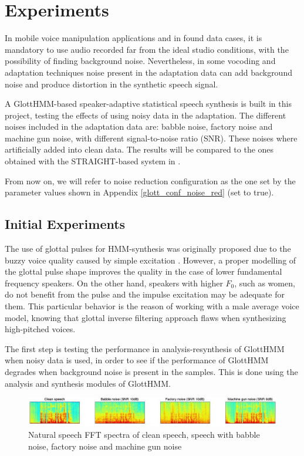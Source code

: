 \section{Experiments}
\label{experiments}
In mobile voice manipulation applications and in found data cases, it is mandatory to use audio recorded far from the ideal studio conditions, with the possibility of finding background noise.
%
Nevertheless, in some vocoding and adaptation techniques noise present in the adaptation data can add background noise and produce distortion in the synthetic speech signal.

A GlottHMM-based speaker-adaptive statistical speech synthesis is built in this project, testing the effects of using noisy data in the adaptation.
%
The different noises included in the adaptation data are: babble noise, factory noise and machine gun noise, with different signal-to-noise ratio (SNR).
%
These noises where artificially added into clean data.
%
The results will be compared to the ones obtained with the STRAIGHT-based system in \cite{karhila_jstsp_14}.

From now on, we will refer to noise reduction configuration as the one set by the parameter values shown in Appendix \ref{glott_conf_noise_red} (set to true).

\subsection{Initial Experiments}
\label{experiments_initial}
The use of glottal pulses for HMM-synthesis was originally proposed due to the buzzy voice quality caused by simple excitation \cite{raitio2008hmm}.
%
However, a proper modelling of the glottal pulse shape improves the quality in the case of lower fundamental frequency speakers. On the other hand, speakers with higher $F_{0}$, such as women, do not benefit from the pulse and the impulse excitation may be adequate for them.
%
This particular behavior is the reason of working with a male average voice model, knowing that glottal inverse filtering approach flaws when synthesizing high-pitched voices.

The first step is testing the performance in analysis-resynthesis of GlottHMM when noisy data is used, in order to see if the performance of GlottHMM degrades when background noise is present in the samples. This is done using the analysis and synthesis modules of GlottHMM.

\begin{figure}[!htb]
\begin{centering}
\includegraphics[width=\textwidth]{images/natural_spectra.jpg}
\caption{Natural speech FFT spectra of clean speech, speech with babble noise, factory noise and machine gun noise}
\label{fig:natural_spectra}
\end{centering}
\end{figure}

